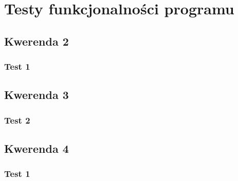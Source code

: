 \documentclass{article}
\begin{document}
\section{Testy funkcjonalności programu}
\subsection{Kwerenda 2}
\subsubsection{Test 1}
\subsection{Kwerenda 3}
\subsubsection{Test 2}
\subsection{Kwerenda 4}
\subsubsection{Test 1}
\end{document}
